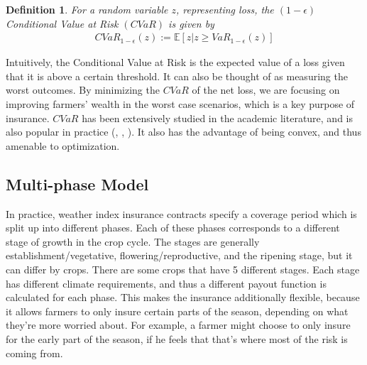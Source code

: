 \documentclass[11pt]{article}
\newtheorem{defn}[lemma]{Definition}
\begin{document}
    \begin{defn}
        For a random variable $z$, representing loss, the $(1-\epsilon)$ Conditional Value at Risk $(CVaR)$ is given by 
        \begin{align*}
        CVaR_{1-\epsilon}(z) := \mathbb{E}\left [z | z \geq VaR_{1-\epsilon}(z) \right ]
        \end{align*}
    \end{defn}

    Intuitively, the Conditional Value at Risk is the expected value of a loss given that it is above a certain threshold. It can also be thought of as measuring the worst outcomes. By minimizing the $CVaR$ of the net loss, we are focusing on improving farmers' wealth in the worst case scenarios, which is a key purpose of insurance. $CVaR$ has been extensively studied in the academic literature, and is also popular in practice (\cite{rockafellar2000optimization}, \cite{rockafellar2002conditional}, \cite{artzner1999coherent}). It also has the advantage of being convex, and thus amenable to optimization.

  \subsection{Multi-phase Model}
    In practice, weather index insurance contracts specify a coverage period which is split up into different phases. Each of these phases corresponds to a different stage of growth in the crop cycle. The stages are generally establishment/vegetative, flowering/reproductive, and the ripening stage, but it can differ by crops. There are some crops that have 5 different stages. Each stage has different climate requirements, and thus a different payout function is calculated for each phase. This makes the insurance additionally flexible, because it allows farmers to only insure certain parts of the season, depending on what they're more worried about. For example, a farmer might choose to only insure for the early part of the season, if he feels that that's where most of the risk is coming from. 
    
\end{document}
